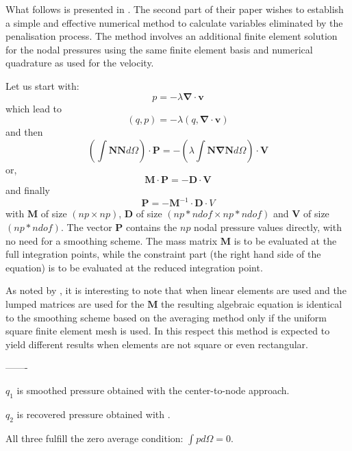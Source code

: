 What follows is presented in \cite{zina82}. The second part of their paper wishes to establish a simple
and effective numerical method to calculate variables eliminated by the penalisation process. 
The method involves an additional finite element solution for the nodal pressures using 
the same finite element basis and numerical quadrature as used for the velocity.

Let us start with:
\[
p = -\lambda {\bm \nabla}\cdot {\bm v}
\]
which lead to
\[
(q,p)=-\lambda (q,{\bm \nabla}\cdot{\bm v})
\]
and then
\[
\left( \int {\bm N} {\bm N} d\Omega \right) \cdot {\bm P} = - \left( \lambda \int {\bm N} {\bm \nabla}{\bm N} d\Omega \right)\cdot{\bm V}
\]
or, 
\[
{\bm M} \cdot {\bm P} = - {\bm D}\cdot{\bm V}
\]
and finally
\[
{\bm P} = -{\bm M}^{-1} \cdot {\bm D} \cdot {V}
\]
with ${\bm M}$ of size $(np\times np)$, ${\bm D}$ of size $(np*ndof\times np*ndof)$ and ${\bm V}$ of size $(np*ndof)$.
The vector ${\bm P}$ contains the $np$ nodal pressure values directly, with no need for a smoothing scheme. 
The mass matrix ${\bm M}$ is to be evaluated at the full integration points, while the constraint part (the right
hand side of the equation) is to be evaluated at the reduced integration point. 

As noted by \cite{zina82}, it is interesting to note that when linear elements are used and the lumped matrices
are used for the ${\bm M}$ the resulting algebraic equation is identical to the smoothing scheme based
on the averaging method only if the uniform square finite element mesh is used. 
In this respect this method is expected to yield different results when elements are not square or even rectangular.

-------

$q_1$ is smoothed pressure obtained with the  center-to-node approach.

$q_2$ is recovered pressure obtained with \cite{zina82}.

All three fulfill the zero average condition: $\int p d\Omega = 0$.

